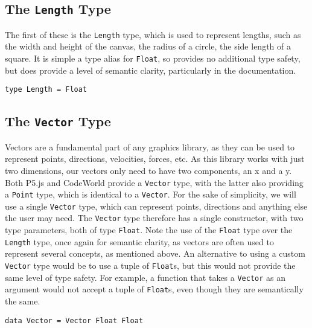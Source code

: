 \documentclass[../main.tex]{subfiles}
\begin{document}
        \subsection{The \texttt{Length}
            Type} The first of these is the \texttt{Length} type, which is used to
                represent lengths, such as the width and height of the canvas, the radius of a
                circle, the side length of a square.
            It is simple a type alias for \texttt{Float}, so provides no additional type
                safety, but does provide a level of semantic clarity, particularly in the
                documentation.
            \begin{lstlisting}[label={lst:length}, caption={The \texttt{Length} type definition.}]
type Length = Float\end{lstlisting}

        \subsection{The \texttt{Vector}
            Type} Vectors are a fundamental part of any graphics library, as they can be
                used to represent points, directions, velocities, forces, etc. As this library
                works with just two dimensions, our vectors only need to have two components,
                an x and a y.
            Both P5.js and CodeWorld provide a \texttt{Vector} type, with the latter also
                providing a \texttt{Point} type, which is identical to a \texttt{Vector}.
            For the sake of simplicity, we will use a single \texttt{Vector} type, which
                can represent points, directions and anything else the user may need.
            The \texttt{Vector} type therefore has a single constructor, with two type
                parameters, both of type \texttt{Float}.
            Note the use of the \texttt{Float} type over the \texttt{Length} type, once
                again for semantic clarity, as vectors are often used to represent several
                concepts, as mentioned above.
            An alternative to using a custom \texttt{Vector} type would be to use a tuple
                of \texttt{Float}s, but this would not provide the same level of type safety.
            For example, a function that takes a \texttt{Vector} as an argument would not
                accept a tuple of \texttt{Float}s, even though they are semantically the same.

            \begin{lstlisting}[label={lst:vector}, caption={The \texttt{Vector} type definition.}]
data Vector = Vector Float Float\end{lstlisting}
\end{document}
